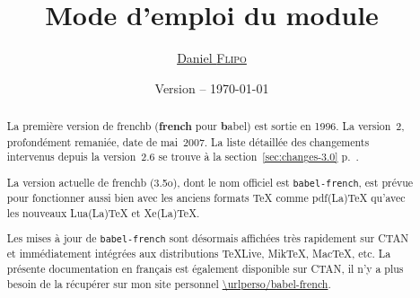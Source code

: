 \documentclass[a4paper,12pt,german,english,french]{article}
\title{Mode d’emploi du module \ext{babel-french}}
\author{\href{mailto:daniel.flipo@free.fr}{Daniel \textsc{Flipo}}}
\date{Version {\latestversion} -- \today}
\def\ColorVerb{\color{MidnightBlue}}
\newcommand*{\ext}[1]{\texttt{\ColorVerb #1}}
\newcommand*{\latestversion}{3.5o}
\begin{document}
\maketitle
\thispagestyle{empty}

\begin{abstract}
  La première version de frenchb (\textbf{french} pour \textbf{b}abel) est
  sortie en 1996.  La version~2, profondément remaniée, date de mai~2007.
  La liste détaillée des changements intervenus depuis la version~2.6 se
  trouve à la section~\ref{sec:changes-3.0} p.~\pageref{sec:changes-3.0}.

  La version actuelle de frenchb (\latestversion), dont le nom officiel est
  \ext{babel-french}, est prévue pour fonctionner aussi bien avec les anciens
  formats TeX comme pdf(La)TeX qu’avec les nouveaux Lua(La)TeX et Xe(La)TeX.

  Les mises à jour de \ext{babel-french} sont désormais affichées très
  rapidement sur CTAN et immédiatement intégrées aux distributions TeXLive,
  MikTeX, MacTeX, etc.
  La présente documentation en français est également disponible sur CTAN,
  il n’y a plus besoin de la récupérer sur mon site
  personnel {\expandafter\expandafter\expandafter\url{\urlperso/babel-french}}.
\end{abstract}
\end{document}
